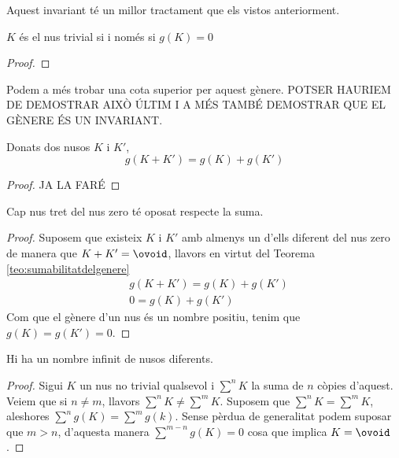 Aquest invariant té un millor tractament que els vistos anteriorment.

\begin{proposition}
	$K$ és el nus trivial si i només si $g(K)=0$
\end{proposition}

\begin{proof}
	
\end{proof}

Podem a més trobar una cota superior per aquest gènere. POTSER HAURIEM DE DEMOSTRAR AIXÒ ÚLTIM I A MÉS TAMBÉ DEMOSTRAR QUE EL GÈNERE ÉS UN INVARIANT.\\

\begin{theorem}\label{teo:sumabilitatdelgenere}
	Donats dos nusos $K$ i $K'$, $$g(K+K')=g(K)+g(K')$$
\end{theorem}

\begin{proof}
	JA LA FARÉ
\end{proof}

\begin{corolary}
	Cap nus tret del nus zero té oposat respecte la suma.
\end{corolary}

\begin{proof}
	Suposem que existeix $K$ i $K'$ amb almenys un d'ells diferent del nus zero de manera que $K+K'=\ovoid$, llavors en virtut del Teorema \ref{teo:sumabilitatdelgenere}
	\begin{align*}
		&g(K+K')=g(K)+g(K')\\
		&0=g(K)+g(K')
	\end{align*}
	Com que el gènere d'un nus és un nombre positiu, tenim que $g(K)=g(K')=0$.
\end{proof}

\begin{corolary}
	Hi ha un nombre infinit de nusos diferents.
\end{corolary}

\begin{proof}
	Sigui $K$ un nus no trivial qualsevol i $\sum^{n}K$ la suma de $n$ còpies d'aquest. Veiem que si $n\neq m$, llavors $\sum^{n}K\neq\sum^{m}K$. Suposem que $\sum^{n}K=\sum^{m}K$, aleshores $\sum^{n}g(K)=\sum^{m}g(k)$. Sense pèrdua de generalitat podem suposar que $m>n$, d'aquesta manera $\sum^{m-n}g(K)=0$ cosa que implica $K=\ovoid$.
\end{proof}

